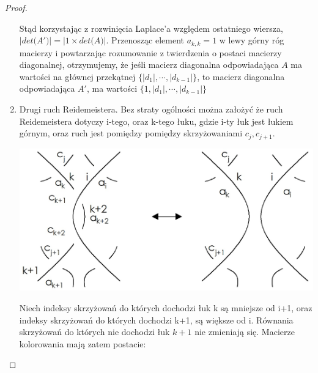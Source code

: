 \begin{proof}
\begin{enumerate}
\begin{minipage}{0.5\textwidth}
\begin{center}
\end{center}
\end{minipage}

Stąd korzystając z rozwinięcia Laplace'a względem ostatniego wiersza, $\vert det \big(A'\big) \vert = \vert 1 \times det \big(A\big) \vert$. Przenosząc element $a_{k,k} =1$ w lewy górny róg macierzy i powtarzając rozumowanie z twierdzenia o postaci macierzy diagonalnej, otrzymujemy, że jeśli macierz diagonalna odpowiadająca $A$ ma wartości na głównej przekątnej $\lbrace \vert d_{1} \vert, \cdots, \vert d_{k-1} \vert \rbrace$, to macierz diagonalna odpowiadająca $A'$, ma wartości $\lbrace 1, \vert d_{1} \vert, \cdots, \vert d_{k-1} \vert \rbrace$

\item Drugi ruch Reidemeistera. Bez straty ogólności można założyć że ruch Reidemeistera dotyczy i-tego, oraz k-tego łuku, gdzie i-ty łuk jest łukiem górnym, oraz ruch jest pomiędzy pomiędzy skrzyżowaniami $ c_{j}, c_{j+1}$. 

\begin{center}
			\includegraphics[scale=0.25]{2/Obrazy/R2det}
\end{center}

Niech indeksy skrzyżowań do których dochodzi łuk k są mniejsze od i+1, oraz indeksy skrzyżowań do których dochodzi k+1, są większe od i. Równania skrzyżowań do których nie dochodzi łuk $k+1$ nie zmieniają się. Macierze kolorowania mają zatem postacie:

\begin{center}


\end{center}
\end{enumerate}
\end{proof}
